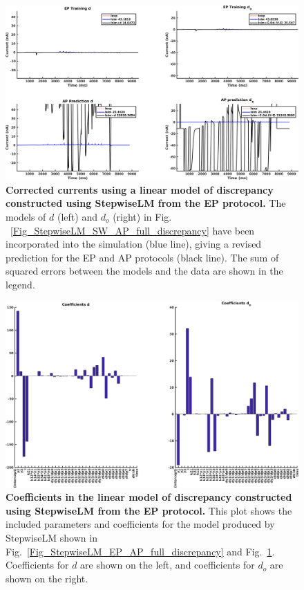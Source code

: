 \documentclass[11pt,a4paper,oneside]{article}
\begin{document}
\begin{figure}[hb]
\begin{center}
\includegraphics[scale=0.42]{Figures/StepwiseLM_EP_AP_full_currents.png}
\caption{\textbf{Corrected currents using a linear model of discrepancy constructed using StepwiseLM from the EP protocol.} The models of $d$ (left) and $d_o$ (right) in Fig. ~\ref{Fig_StepwiseLM_SW_AP_full_discrepancy} have been incorporated into the simulation (blue line), giving a revised prediction for the EP and AP protocols (black line). The sum of squared errors between the models and the data are shown in the legend.}
\label{Fig_StepwiseLM_EP_AP_full_currents}
\end{center}
\end{figure}

\clearpage

\begin{figure}[t]
\begin{center}
\includegraphics[scale=0.42]{Figures/StepwiseLM_EP_AP_full_coefficients.png}
\caption{\textbf{Coefficients in the linear model of discrepancy constructed using StepwiseLM from the EP protocol.} This plot shows the included parameters and coefficients for the model produced by StepwiseLM shown in Fig.~\ref{Fig_StepwiseLM_EP_AP_full_discrepancy} and Fig.~\ref{Fig_StepwiseLM_EP_AP_full_currents}. Coefficients for $d$ are shown on the left, and coefficients for $d_o$ are shown on the right.} 
\label{Fig_StepwiseLM_EP_AP_full_coefficients}
\end{center}
\end{figure}
\end{document}
